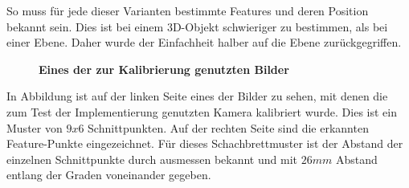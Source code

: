 So muss für jede dieser Varianten bestimmte Features und deren Position bekannt sein. Dies ist bei einem 3D-Objekt schwieriger zu bestimmen, als bei einer Ebene. Daher wurde der Einfachheit halber auf die Ebene zurückgegriffen. 
\begin{figure}
\qquad
{}
\caption{\textbf{Eines der zur Kalibrierung genutzten Bilder}}
\label{Fig:calibplane}

\end{figure}
In Abbildung  ist auf der linken Seite eines der Bilder zu sehen, mit denen die zum Test der Implementierung genutzten Kamera kalibriert wurde. Dies ist ein Muster von $9x6$ Schnittpunkten. Auf der rechten Seite sind die erkannten Feature-Punkte eingezeichnet. Für dieses Schachbrettmuster ist der Abstand der einzelnen Schnittpunkte durch ausmessen bekannt und mit $26mm$ Abstand entlang der Graden voneinander gegeben. 

